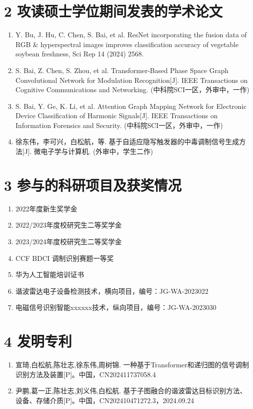 {    \section*{2 攻读硕士学位期间发表的学术论文} 
    \begin{enumerate}
        \item Y. Bu, J. Hu, C. Chen, S. Bai, et al. ResNet incorporating the fusion data of RGB \& hyperspectral images improves classification accuracy of vegetable soybean freshness, Sci Rep 14 (2024) 2568.
        \item S. Bai, Z. Chen, S. Zhou, et al. Transformer-Based Phase Space Graph Convolutional Network for Modulation Recognition[J]. IEEE Transactions on Cognitive Communications and Networking. (中科院SCI一区，外审中，一作)
        \item S. Bai, Y. Ge, K. Li, et al. Attention Graph Mapping Network for Electronic Device Classification of Harmonic Signals[J]. IEEE Transactions on Information Forensics and Security. (中科院SCI一区，外审中，一作)
        \item 徐东伟，李可兴，白松航，等. 基于自适应隐写触发器的中毒调制信号生成方法[J]. 微电子学与计算机. (外审中，学生二作)
    \end{enumerate}

    \section*{3 参与的科研项目及获奖情况}
    \begin{enumerate}
        \item	2022年度新生奖学金
        \item	2022/2023年度校研究生二等奖学金
        \item	2023/2024年度校研究生二等奖学金
        \item	CCF BDCI 调制识别赛题一等奖
        \item	华为人工智能培训证书
        \item	谐波雷达电子设备检测技术，横向项目，编号：JG-WA-2023022
        \item	电磁信号识别智能xxxxxx技术，纵向项目，编号：JG-WA-2023030
    \end{enumerate}

    \section*{4 发明专利}
    \begin{enumerate}
        \item	宣琦,白松航,陈壮志,徐东伟,周树锦. 一种基于Transformer和递归图的信号调制识别方法及装置[P]。中国，CN202411737058.4
        \item	尹鹏,葛一正,陈壮志,刘义伟,白松航. 基于子图融合的谐波雷达目标识别方法、设备、存储介质[P]。中国，CN202410471272.3，2024.09.24
    \end{enumerate}
}


